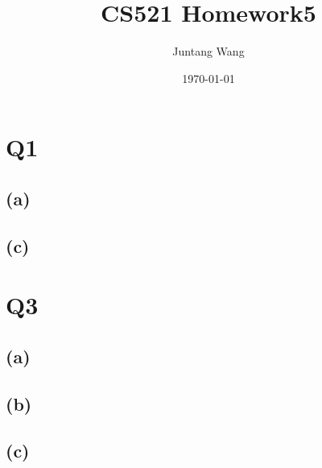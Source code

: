 \documentclass[12pt]{article} %
\title{CS521 Homework5} %
\author{Juntang Wang}        %
\date{\today}             %
\begin{document}
\section{Q1}
\subsection{(a)}

\subsection{(c)}


\section{Q3}
\subsection{(a)}

\subsection{(b)}

\subsection{(c)}


\printbibliography
\end{document}
